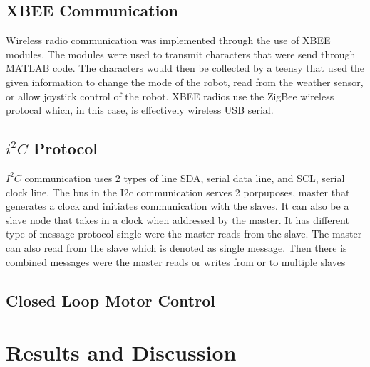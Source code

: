 \documentclass[UTF8]{article}
\begin{document}
\subsection{XBEE Communication}
Wireless radio communication was implemented through the use of XBEE modules. The modules were used to transmit characters that were send through MATLAB code. The characters would then be collected by a teensy that used the given information to change the mode of the robot, read from the weather sensor, or allow joystick control of the robot. XBEE radios use the ZigBee wireless protocal which, in this case, is effectively wireless USB serial.

\subsection{$i^2C$ Protocol}
$I^2C$ communication uses 2 types of line SDA, serial data line, and SCL, serial clock line. The bus in the I2c communication serves 2 porpuposes, master that generates a clock and initiates communication with the slaves. It can also be a slave node that takes in a clock when addressed by the master. It has different type of message protocol single were the master reads from the slave. The master can also read from the slave which is denoted as single message. Then there is combined messages were the master reads or writes from or to multiple slaves

\subsection{Closed Loop Motor Control}


\section{Results and Discussion}
\end{document}
